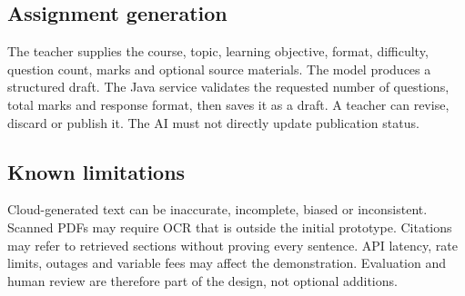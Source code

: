 \documentclass[11pt,a4paper]{article}
\begin{document}
\subsection{Assignment generation}
The teacher supplies the course, topic, learning objective, format, difficulty, question count, marks and optional source materials. The model produces a structured draft. The Java service validates the requested number of questions, total marks and response format, then saves it as a draft. A teacher can revise, discard or publish it. The AI must not directly update publication status.
\subsection{Known limitations}
Cloud-generated text can be inaccurate, incomplete, biased or inconsistent. Scanned PDFs may require OCR that is outside the initial prototype. Citations may refer to retrieved sections without proving every sentence. API latency, rate limits, outages and variable fees may affect the demonstration. Evaluation and human review are therefore part of the design, not optional additions.
\end{document}
